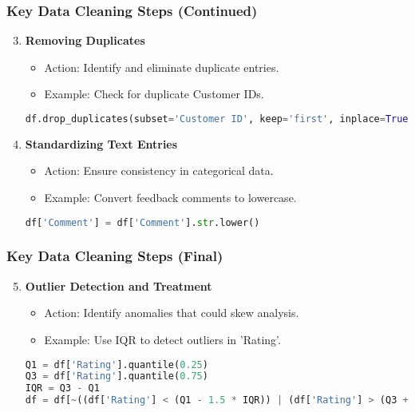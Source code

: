 \documentclass[aspectratio=169]{beamer}
\begin{document}
\begin{frame}[fragile]
    \frametitle{Key Data Cleaning Steps (Continued)}
    \begin{enumerate}
        \setcounter{enumi}{2}
        \item \textbf{Removing Duplicates}
            \begin{itemize}
                \item Action: Identify and eliminate duplicate entries.
                \item Example: Check for duplicate Customer IDs.
            \end{itemize}
            \begin{lstlisting}[language=Python]
df.drop_duplicates(subset='Customer ID', keep='first', inplace=True)
            \end{lstlisting}

        \item \textbf{Standardizing Text Entries}
            \begin{itemize}
                \item Action: Ensure consistency in categorical data.
                \item Example: Convert feedback comments to lowercase.
            \end{itemize}
            \begin{lstlisting}[language=Python]
df['Comment'] = df['Comment'].str.lower()
            \end{lstlisting}
    \end{enumerate}
\end{frame}

\begin{frame}[fragile]
    \frametitle{Key Data Cleaning Steps (Final)}
    \begin{enumerate}
        \setcounter{enumi}{4}
        \item \textbf{Outlier Detection and Treatment}
            \begin{itemize}
                \item Action: Identify anomalies that could skew analysis.
                \item Example: Use IQR to detect outliers in 'Rating'.
            \end{itemize}
            \begin{lstlisting}[language=Python]
Q1 = df['Rating'].quantile(0.25)
Q3 = df['Rating'].quantile(0.75)
IQR = Q3 - Q1
df = df[~((df['Rating'] < (Q1 - 1.5 * IQR)) | (df['Rating'] > (Q3 + 1.5 * IQR)))]
            \end{lstlisting}
    \end{enumerate}
\end{frame}
\end{document}
